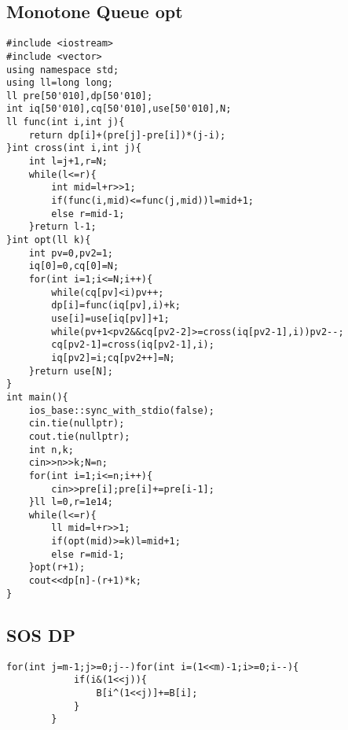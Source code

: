 \documentclass[landscape, 8pt, a4paper, oneside, twocolumn]{extarticle}
\begin{document}
\subsection{Monotone Queue opt}
\begin{verbatim}
#include <iostream>
#include <vector>
using namespace std;
using ll=long long;
ll pre[50'010],dp[50'010];
int iq[50'010],cq[50'010],use[50'010],N;
ll func(int i,int j){
    return dp[i]+(pre[j]-pre[i])*(j-i);
}int cross(int i,int j){
    int l=j+1,r=N;
    while(l<=r){
        int mid=l+r>>1;
        if(func(i,mid)<=func(j,mid))l=mid+1;
        else r=mid-1;
    }return l-1;
}int opt(ll k){
    int pv=0,pv2=1;
    iq[0]=0,cq[0]=N;
    for(int i=1;i<=N;i++){
        while(cq[pv]<i)pv++;
        dp[i]=func(iq[pv],i)+k;
        use[i]=use[iq[pv]]+1;
        while(pv+1<pv2&&cq[pv2-2]>=cross(iq[pv2-1],i))pv2--;
        cq[pv2-1]=cross(iq[pv2-1],i);
        iq[pv2]=i;cq[pv2++]=N;
    }return use[N];
}
int main(){
    ios_base::sync_with_stdio(false);
    cin.tie(nullptr);
    cout.tie(nullptr);
    int n,k;
    cin>>n>>k;N=n;
    for(int i=1;i<=n;i++){
        cin>>pre[i];pre[i]+=pre[i-1];
    }ll l=0,r=1e14;
    while(l<=r){
        ll mid=l+r>>1;
        if(opt(mid)>=k)l=mid+1;
        else r=mid-1;
    }opt(r+1);
    cout<<dp[n]-(r+1)*k;
}
\end{verbatim}
\subsection{SOS DP}
\begin{verbatim}
for(int j=m-1;j>=0;j--)for(int i=(1<<m)-1;i>=0;i--){
            if(i&(1<<j)){
                B[i^(1<<j)]+=B[i];
            }
        }
\end{verbatim}
\end{document}
